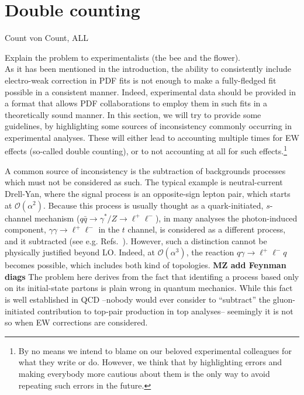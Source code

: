 \section{Double counting}
Count von Count, ALL

Explain the problem to experimentalists (the bee and the flower).\\

As it has been mentioned in the introduction, the ability to consistently include electro-weak correction in
PDF fits is not enough to make a fully-fledged fit possible in a consistent manner. Indeed, experimental data should
be provided in  a format that allows PDF collaborations to employ them in such fits in a theoretically sound manner. In this
section, we will try to provide some guidelines, by highlighting some sources of inconsistency commonly occurring in experimental 
analyses. These will either lead to accounting multiple times for EW effects (so-called double counting), or to not accounting at
all for such effects.\footnote{By no means we intend to blame on our beloved experimental colleagues for what they write or do. However,
    we think that by highlighting errors and making everybody more cautious about them is the only way to avoid repeating such
    errors in the future.}

A common source of inconsistency is the subtraction of backgrounds processes which must not be considered as such. The typical example
is neutral-current Drell-Yan, where the signal process is an opposite-sign lepton pair, which starts
at $\mathcal O(\alpha^2)$. Because this process is usually thought
as a quark-initiated, $s$-channel mechanism ($q\bar q \to \gamma^*/Z \to \ell^+ \ell^-$), in many analyses the photon-induced component,
$\gamma \gamma \to \ell^+ \ell^-$ in the $t$ channel, is considered as a different process, and it 
subtracted (see e.g. Refs.~\cite{}). However, such a distinction cannot be physically
justified beyond LO. Indeed, at $\mathcal O(\alpha^3)$, the reaction $q \gamma \to \ell^+ \ell^- q$ becomes possible, which
includes both kind of topologies. {\bf MZ add Feynman diags} The problem here derives from the fact 
that identifing a process based only on its 
initial-state partons is plain wrong in quantum mechanics. While this fact is well established in QCD --nobody would ever 
consider to ``subtract'' the gluon-initiated contribution to top-pair production in top analyses-- seemingly it is not so
when EW corrections are considered.


